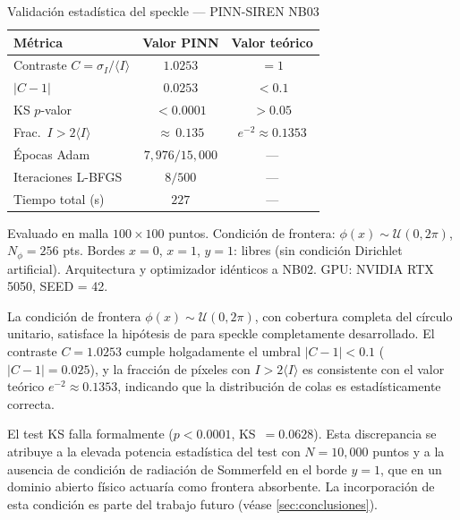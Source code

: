 \begin{table}[htbp]
\centering
\begin{threeparttable}
\caption{Validación estadística del speckle --- PINN-SIREN NB03}
\label{tab:resultados_speckle}
\begin{tabular}{lcc}
\toprule
Métrica & Valor PINN & Valor teórico \\
\midrule
Contraste $C = \sigma_I / \langle I \rangle$ & $1.0253$ & $= 1$ \\
$|C - 1|$                                    & $0.0253$ & $< 0.1$ \\
KS $p$-valor                                 & $< 0.0001$ & $> 0.05$ \\
Frac.\ $I > 2\langle I \rangle$              & ${\approx}\,0.135$ & $e^{-2} \approx 0.1353$ \\
\midrule
Épocas Adam                                  & $7{,}976 / 15{,}000$ & --- \\
Iteraciones L-BFGS                           & $8 / 500$ & --- \\
Tiempo total (s)                             & $227$ & --- \\
\bottomrule
\end{tabular}
\begin{tablenotes}
\small
\item Evaluado en malla $100 \times 100$ puntos.
      Condición de frontera: $\phi(x) \sim \mathcal{U}(0, 2\pi)$, $N_\phi = 256$ pts.
      Bordes $x=0$, $x=1$, $y=1$: libres (sin condición Dirichlet artificial).
      Arquitectura y optimizador idénticos a NB02.
      GPU: NVIDIA RTX 5050, SEED = 42.
\end{tablenotes}
\end{threeparttable}
\end{table}

La condición de frontera $\phi(x) \sim \mathcal{U}(0, 2\pi)$, con cobertura completa del
círculo unitario, satisface la hipótesis de \citet{Goodman2007_Speckle} para speckle
completamente desarrollado.
El contraste $C = 1.0253$ cumple holgadamente el umbral $|C-1| < 0.1$ ($|C-1| = 0.025$),
y la fracción de píxeles con $I > 2\langle I \rangle$ es consistente con el valor teórico
$e^{-2} \approx 0.1353$, indicando que la distribución de colas es estadísticamente correcta.

El test KS falla formalmente ($p < 0.0001$, KS~$= 0.0628$).
Esta discrepancia se atribuye a la elevada potencia estadística del test con $N = 10{,}000$ puntos
y a la ausencia de condición de radiación de Sommerfeld en el borde $y = 1$, que en un dominio
abierto físico actuaría como frontera absorbente.
La incorporación de esta condición es parte del trabajo futuro (véase \cref{sec:conclusiones}).

